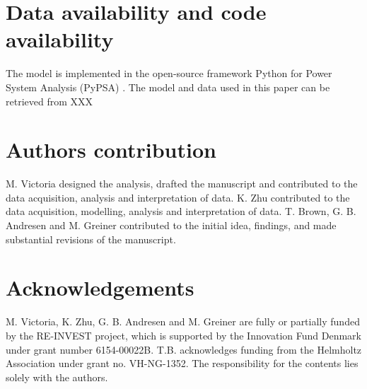 \documentclass[5p]{elsarticle} %
\begin{document}
\section{Data availability and code availability}

The model is implemented in the open-source framework Python for Power System Analysis (PyPSA) \cite{PyPSA}. The model and data used in this paper can be retrieved from \textcolor[rgb]{1,0,0}{XXX}

\section{Authors contribution}

M. Victoria designed the analysis, drafted the manuscript and contributed to the data acquisition, analysis and interpretation of data. K. Zhu contributed to the data acquisition, modelling, analysis and interpretation of data. 
T. Brown, G. B. Andresen and M. Greiner contributed to the initial idea, findings, and made substantial revisions of the manuscript. 

\section{Acknowledgements}
M. Victoria, K. Zhu, G. B. Andresen and M. Greiner are fully or partially funded by the RE-INVEST project, which is supported by  the  Innovation  Fund  Denmark  under  grant  number  6154-00022B. T.B. acknowledges funding from the Helmholtz Association under grant no. VH-NG-1352. The responsibility for the contents lies solely with the authors.


\end{document}
